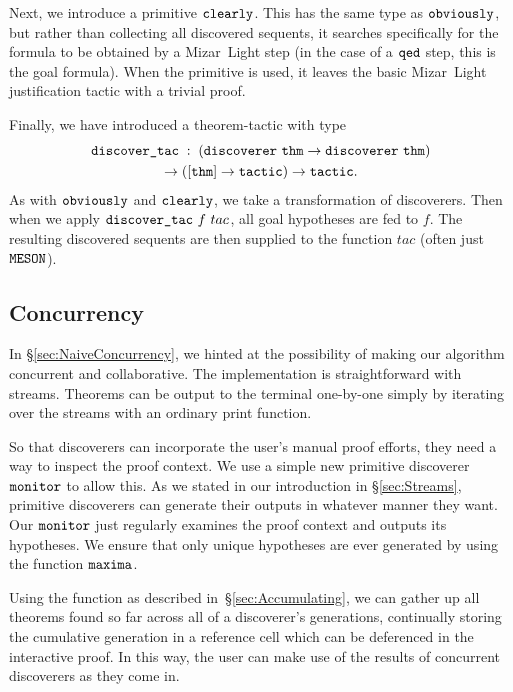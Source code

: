 Next, we introduce a primitive $\texttt{clearly}$. This has the same type as $\texttt{obviously}$, but rather than collecting all discovered sequents, it searches specifically for the formula to be obtained by a Mizar~Light step (in the case of a $\texttt{qed}$ step, this is the goal formula). When the  primitive is used, it leaves the basic Mizar~Light justification tactic with a trivial proof.

\label{sec:DiscoverTac}
Finally, we have introduced a theorem-tactic  with type
\begin{multline*}
\code{discover\_tac}\;:\;(\code{discoverer}\ \code{thm}\rightarrow\code{discoverer} \ \code{thm}) \\\rightarrow ([\code{thm}] \rightarrow \code{tactic}) \rightarrow \code{tactic}.
\end{multline*}
As with $\texttt{obviously}$ and $\texttt{clearly}$, we take a transformation of discoverers. Then when we apply $\texttt{discover\_tac}\ f\ tac$,  all goal hypotheses are fed to $f$. The resulting discovered sequents are then supplied to the function $tac$ (often just $\texttt{MESON}$).

\subsection{Concurrency}\label{sec:Concurrency}
In \S\ref{sec:NaiveConcurrency}, we hinted at the possibility of making our algorithm concurrent and collaborative. The implementation is straightforward with streams. Theorems can be output to the terminal one-by-one simply by iterating over the streams with an ordinary print function.

So that discoverers can incorporate the user's manual proof efforts, they need a way to inspect the proof context. We use a simple new primitive discoverer $\texttt{monitor}$ to allow this. As we stated in our introduction in \S\ref{sec:Streams}, primitive discoverers can generate their outputs in whatever manner they want. Our $\texttt{monitor}$ just regularly examines the proof context and outputs its hypotheses. We ensure that only unique hypotheses are ever generated by using the function $\texttt{maxima}$.

Using the  function as described in~\S\ref{sec:Accumulating}, we can gather up all theorems found so far across all of a discoverer's generations, continually storing the cumulative generation in a reference cell  which can be deferenced in the interactive proof. In this way, the user can make use of the results of concurrent discoverers as they come in.

